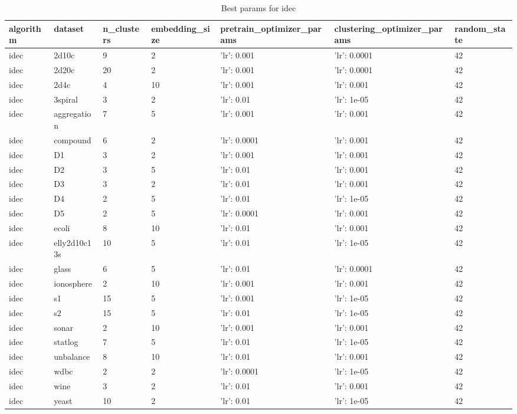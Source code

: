 \begin{table}[H]
\centering
\caption{Best params for idec}
\label{S28_Table}
\begin{tabular}{|l|l|l|l|l|l|l|}
\hline
algorithm & dataset & n\_clusters & embedding\_size & pretrain\_optimizer\_params & clustering\_optimizer\_params & random\_state \\
\hline
idec & 2d10c & 9 & 2 & {'lr': 0.001} & {'lr': 0.0001} & 42 \\
\hline
idec & 2d20c & 20 & 2 & {'lr': 0.001} & {'lr': 0.0001} & 42 \\
\hline
idec & 2d4c & 4 & 10 & {'lr': 0.001} & {'lr': 0.001} & 42 \\
\hline
idec & 3spiral & 3 & 2 & {'lr': 0.01} & {'lr': 1e-05} & 42 \\
\hline
idec & aggregation & 7 & 5 & {'lr': 0.001} & {'lr': 0.001} & 42 \\
\hline
idec & compound & 6 & 2 & {'lr': 0.0001} & {'lr': 0.001} & 42 \\
\hline
idec & D1 & 3 & 2 & {'lr': 0.001} & {'lr': 0.001} & 42 \\
\hline
idec & D2 & 3 & 5 & {'lr': 0.01} & {'lr': 0.001} & 42 \\
\hline
idec & D3 & 3 & 2 & {'lr': 0.01} & {'lr': 0.001} & 42 \\
\hline
idec & D4 & 2 & 5 & {'lr': 0.01} & {'lr': 1e-05} & 42 \\
\hline
idec & D5 & 2 & 5 & {'lr': 0.0001} & {'lr': 0.001} & 42 \\
\hline
idec & ecoli & 8 & 10 & {'lr': 0.01} & {'lr': 0.001} & 42 \\
\hline
idec & elly2d10c13s & 10 & 5 & {'lr': 0.01} & {'lr': 1e-05} & 42 \\
\hline
idec & glass & 6 & 5 & {'lr': 0.01} & {'lr': 0.0001} & 42 \\
\hline
idec & ionosphere & 2 & 10 & {'lr': 0.001} & {'lr': 0.001} & 42 \\
\hline
idec & s1 & 15 & 5 & {'lr': 0.001} & {'lr': 1e-05} & 42 \\
\hline
idec & s2 & 15 & 5 & {'lr': 0.01} & {'lr': 1e-05} & 42 \\
\hline
idec & sonar & 2 & 10 & {'lr': 0.001} & {'lr': 0.001} & 42 \\
\hline
idec & statlog & 7 & 5 & {'lr': 0.01} & {'lr': 1e-05} & 42 \\
\hline
idec & unbalance & 8 & 10 & {'lr': 0.01} & {'lr': 0.001} & 42 \\
\hline
idec & wdbc & 2 & 2 & {'lr': 0.0001} & {'lr': 1e-05} & 42 \\
\hline
idec & wine & 3 & 2 & {'lr': 0.01} & {'lr': 0.001} & 42 \\
\hline
idec & yeast & 10 & 2 & {'lr': 0.01} & {'lr': 1e-05} & 42 \\
\hline
\end{tabular}
\end{table}

